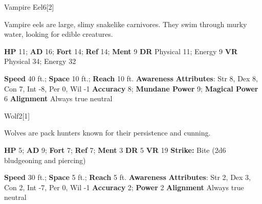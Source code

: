   \begin{monsection}{Vampire Eel}{6}[2]
    \vspace{-1em}\vspace{-1em}
    \vspace{0em}

    
      Vampire eels are large, slimy snakelike carnivores.
      They swim through murky water, looking for edible creatures.
    
    

    \begin{spellcontent}
      \begin{spelltargetinginfo}
        \pari \textbf{HP} 11;
          \textbf{AD} 16;
          \textbf{Fort} 14;
          \textbf{Ref} 14;
          \textbf{Ment} 9
        \pari \textbf{DR} Physical 11; Energy 9
        \pari \textbf{VR} Physical 34; Energy 32
        
      \end{spelltargetinginfo}
    \end{spellcontent}
    \begin{monsterfooter}
      \pari \textbf{Speed} 40 ft.;
        \textbf{Space} 10 ft.;
        \textbf{Reach} 10 ft.
      \pari \textbf{Awareness} 
      \pari \textbf{Attributes}:
        Str 8, Dex 8,
        Con 7, Int -8,
        Per 0, Wil -1
      \pari \textbf{Accuracy} 8;
        \textbf{Mundane Power} 9;
      \textbf{Magical Power} 6
      \pari \textbf{Alignment} Always true neutral
    \end{monsterfooter}
  \end{monsection}
  
  
  \begin{monsection}{Wolf}{2}[1]
    \vspace{-1em}\vspace{-1em}
    \vspace{0em}

    
      Wolves are pack hunters known for their persistence and cunning.
    
    

    \begin{spellcontent}
      \begin{spelltargetinginfo}
        \pari \textbf{HP} 5;
          \textbf{AD} 9;
          \textbf{Fort} 7;
          \textbf{Ref} 7;
          \textbf{Ment} 3
        \pari \textbf{DR} 5
        \pari \textbf{VR} 19
        \pari \textbf{Strike:}
            Bite  (2d6 bludgeoning and piercing)
      \end{spelltargetinginfo}
    \end{spellcontent}
    \begin{monsterfooter}
      \pari \textbf{Speed} 30 ft.;
        \textbf{Space} 5 ft.;
        \textbf{Reach} 5 ft.
      \pari \textbf{Awareness} 
      \pari \textbf{Attributes}:
        Str 2, Dex 3,
        Con 2, Int -7,
        Per 0, Wil -1
      \pari \textbf{Accuracy} 2;
        \textbf{Power} 2
      \pari \textbf{Alignment} Always true neutral
    \end{monsterfooter}
  \end{monsection}
  
